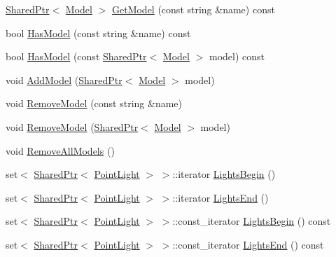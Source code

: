 \begin{DoxyCompactItemize}
\hyperlink{namespacemage_a1e01ae66713838a7a67d30e44c67703e}{Shared\+Ptr}$<$ \hyperlink{classmage_1_1_model}{Model} $>$ \hyperlink{classmage_1_1_world_ac91abee028df87d8879332e0df3d9e8a}{Get\+Model} (const string \&name) const
\item 
bool \hyperlink{classmage_1_1_world_a381e0a56fc1ba6d0955a248f7b0f0c22}{Has\+Model} (const string \&name) const
\item 
bool \hyperlink{classmage_1_1_world_a821d420241b2a94502b20e24595490df}{Has\+Model} (const \hyperlink{namespacemage_a1e01ae66713838a7a67d30e44c67703e}{Shared\+Ptr}$<$ \hyperlink{classmage_1_1_model}{Model} $>$ model) const
\item 
void \hyperlink{classmage_1_1_world_a4b7287a11ff316b029ec7727ed0d076d}{Add\+Model} (\hyperlink{namespacemage_a1e01ae66713838a7a67d30e44c67703e}{Shared\+Ptr}$<$ \hyperlink{classmage_1_1_model}{Model} $>$ model)
\item 
void \hyperlink{classmage_1_1_world_aebba267c6c47de1c806ffe49be273dea}{Remove\+Model} (const string \&name)
\item 
void \hyperlink{classmage_1_1_world_afad0c7024fcd304bb582bdc1d281c590}{Remove\+Model} (\hyperlink{namespacemage_a1e01ae66713838a7a67d30e44c67703e}{Shared\+Ptr}$<$ \hyperlink{classmage_1_1_model}{Model} $>$ model)
\item 
void \hyperlink{classmage_1_1_world_af3bae7b62192de9edda5e0567b73be93}{Remove\+All\+Models} ()
\item 
set$<$ \hyperlink{namespacemage_a1e01ae66713838a7a67d30e44c67703e}{Shared\+Ptr}$<$ \hyperlink{classmage_1_1_point_light}{Point\+Light} $>$ $>$\+::iterator \hyperlink{classmage_1_1_world_a48964d5262a080dd866e612d7daa6bf2}{Lights\+Begin} ()
\item 
set$<$ \hyperlink{namespacemage_a1e01ae66713838a7a67d30e44c67703e}{Shared\+Ptr}$<$ \hyperlink{classmage_1_1_point_light}{Point\+Light} $>$ $>$\+::iterator \hyperlink{classmage_1_1_world_a52c035bf11269bb9cc6fb537532bfeab}{Lights\+End} ()
\item 
set$<$ \hyperlink{namespacemage_a1e01ae66713838a7a67d30e44c67703e}{Shared\+Ptr}$<$ \hyperlink{classmage_1_1_point_light}{Point\+Light} $>$ $>$\+::const\+\_\+iterator \hyperlink{classmage_1_1_world_a45b3876de39fd5d7bd176f029cf4c535}{Lights\+Begin} () const
\item 
set$<$ \hyperlink{namespacemage_a1e01ae66713838a7a67d30e44c67703e}{Shared\+Ptr}$<$ \hyperlink{classmage_1_1_point_light}{Point\+Light} $>$ $>$\+::const\+\_\+iterator \hyperlink{classmage_1_1_world_a752ce259cdcffdfba51e2c9e480d2ddc}{Lights\+End} () const

\end{DoxyCompactItemize}
